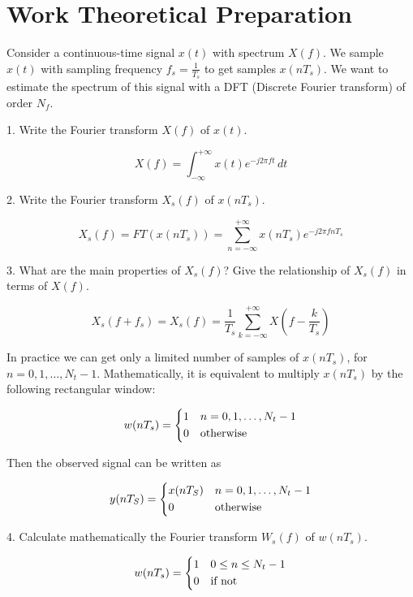 \documentclass{article}
\begin{document}
\section{Work Theoretical Preparation}
Consider a continuous-time signal $x(t)$ with spectrum $X(f)$. We sample $x(t)$ with sampling frequency $f_s = \frac{1}{T_s}$ to get samples $x(nT_s)$. We want to estimate the spectrum of this signal with a DFT (Discrete Fourier transform) of order $N_f$.

1. Write the Fourier transform $X(f)$ of $x(t)$.

\begin{equation}
    X(f) = \int_{-\infty}^{+\infty}x(t)e^{-j2\pi ft}\,dt
\end{equation}

2. Write the Fourier transform $X_s(f)$ of $x(nT_s)$.

\begin{equation}
    X_s(f) = FT(x(nT_s)) = \sum_{n=-\infty}^{+\infty} x(nT_s)e^{-j2\pi fnT_s}
\end{equation}

3. What are the main properties of $X_s(f)$? Give the relationship of $X_s(f)$ in terms of $X(f)$.

\begin{equation}
    X_s(f+f_s) = X_s(f) = \frac{1}{T_s} \sum_{k=-\infty}^{+\infty}X(f-\frac{k}{T_s})
\end{equation}

In practice we can get only a limited number of samples of $x(nT_s)$, for $n = 0,1,\ldots,N_t-1$. Mathematically, it is equivalent to multiply $x(nT_s)$ by the following rectangular window:

\[
w(nT_s) =
\begin{dcases}
    1 & n = 0,1,\ldots,N_t-1\\
    0 & \text{otherwise}
\end{dcases}
\]

Then the observed signal can be written as 

\[
y(nT_S)=
\begin{dcases}
    x(nT_S) & n = 0,1,\ldots,N_t-1\\
    0 & \text{otherwise}
\end{dcases}
\]

4. Calculate mathematically the Fourier transform $W_s(f)$ of $w(nT_s)$.

\begin{equation}
    w(nT_s) =
    \begin{dcases}
        1 & 0 \leq n \leq N_t-1\\
        0 & \text{if not}
    \end{dcases}
\end{equation}
\end{document}
